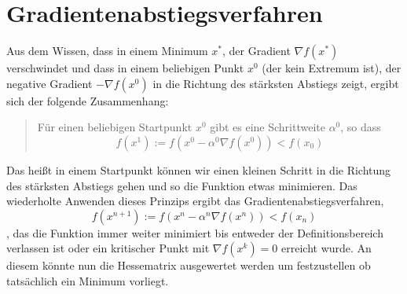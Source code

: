 \documentclass[]{book}
\theoremstyle{definition}
\theoremstyle{definition}
\theoremstyle{definition}
\theoremstyle{definition}
\theoremstyle{remark}
\begin{document}
\hypertarget{gradientenabstiegsverfahren}{%
\section{Gradientenabstiegsverfahren}\label{gradientenabstiegsverfahren}}

Aus dem Wissen, dass in einem Minimum \(x^*\), der Gradient \(\nabla f(x^*)\) verschwindet und dass in einem beliebigen Punkt \(x^0\) (der kein Extremum ist), der negative Gradient \(-\nabla f(x^0)\) in die Richtung des stärksten Abstiegs zeigt, ergibt sich der folgende Zusammenhang:

\begin{quote}
Für einen beliebigen Startpunkt \(x^0\) gibt es eine Schrittweite \(\alpha^0\), so dass
\[f(x^1) := f(x^0 - \alpha^0 \nabla f(x^0)) < f(x_0) \]
\end{quote}

Das heißt in einem Startpunkt können wir einen kleinen Schritt in die Richtung des stärksten Abstiegs gehen und so die Funktion etwas minimieren. Das wiederholte Anwenden dieses Prinzips ergibt das Gradientenabstiegsverfahren,
\[f(x^{n+1}) := f(x^n - \alpha^n \nabla f(x^n)) < f(x_n) \],
das die Funktion immer weiter minimiert bis entweder der Definitionsbereich verlassen ist oder ein kritischer Punkt mit \(\nabla f(x^k)=0\) erreicht wurde. An diesem könnte nun die Hessematrix ausgewertet werden um festzustellen ob tatsächlich ein Minimum vorliegt.
\end{document}

